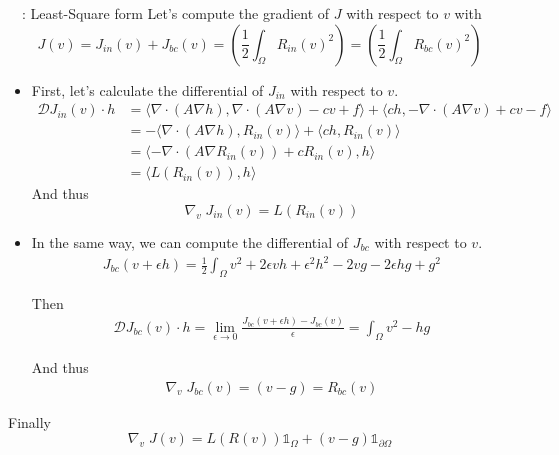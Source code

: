 \begin{frame}[allowframebreaks]{\appendixname~\theappendixframenumber~: Least-Square form}
	Let's compute the gradient of $J$ with respect to $v$ with
	\begin{equation*}
		J(v)=J_{in}(v)+J_{bc}(v)=\left(\frac{1}{2}\int_\Omega R_{in}(v)^2\right)=\left(\frac{1}{2}\int_\Omega R_{bc}(v)^2\right)
	\end{equation*}
	\begin{itemize}[\textbullet]
		\item First, let's calculate the differential of $J_{in}$ with respect to $v$.
		\begin{align*}
			\mathcal{D}J_{in}(v)\cdot h &= \langle \nabla\cdot(A\nabla h), \nabla\cdot(A\nabla v) - cv +f \rangle+\langle ch, -\nabla\cdot(A\nabla v) + cv - f \rangle \\ 
			&= -\langle \nabla\cdot(A\nabla h), R_{in}(v) \rangle+\langle ch, R_{in}(v)\rangle \\ 
			&= \langle -\nabla\cdot(A\nabla R_{in}(v))+cR_{in}(v), h \rangle \\
			&= \langle L(R_{in}(v)), h \rangle
		\end{align*}
		And thus		
		\begin{equation*}
			\nabla_v \; J_{in}(v) = L(R_{in}(v))
		\end{equation*}
	
		\newpage
		
		\item In the same way, we can compute the differential of $J_{bc}$ with respect to $v$.
		\begin{align*}
			J_{bc}(v+\epsilon h)=\frac{1}{2} \int_{\Omega} v^2+2\epsilon vh +\epsilon^2 h^2 - 2vg - 2\epsilon hg+g^2
		\end{align*}
		
		Then
		\begin{align*}
			\mathcal{D}J_{bc}(v)\cdot h =  \lim_{\epsilon\rightarrow 0}\frac{J_{bc}(v+\epsilon h)-J_{bc}(v)}{\epsilon} = \int_{\Omega} v^2 - hg
		\end{align*}
		
		And thus
		\begin{align*}
			\nabla_v \; J_{bc}(v) = (v-g) = R_{bc}(v) 
		\end{align*}
	\end{itemize}
	
	Finally
	\begin{equation*}
		\nabla_v \; J(v) = L(R(v))\mathds{1}_\Omega + (v-g)\mathds{1}_{\partial\Omega}
	\end{equation*}
	
\end{frame}
\addtocounter{appendixframenumber}{1}

